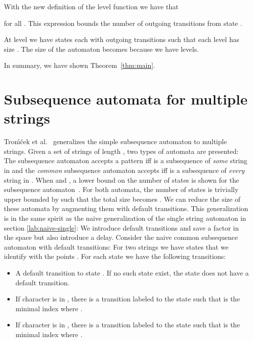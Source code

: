 \documentclass[a4paper,11pt]{article}
\begin{document}
With the new definition of the level function we have that 

for all .
This expression bounds the number of outgoing transitions from state .


At level  we have  states each with  outgoing transitions such that each level has size . The size of the automaton becomes  because we have  levels.

In summary, we have shown Theorem~\ref{thm:main}.





    
    
\section{Subsequence automata for multiple strings}







Tron\'{\i}\v{c}ek et al.~\cite{CMT2003} generalizes the simple subsequence automaton to multiple strings. Given a set of strings  of length , two types of automata are presented: The subsequence automaton accepts a pattern  iff  is a subsequence of \emph{some} string in  and the \emph{common} subsequence automaton accepts  iff  is a subsequence of \emph{every} string in . When  and , a  lower bound on the number of states is shown for the subsequence automaton~\cite{tronivcek2005size}. For both automata, the number of states is trivially upper bounded by  such that the total size becomes . We can reduce the size of these automata by augmenting them with default transitions. This generalization is in the same spirit as the naive generalization of the single string automaton in section \ref{lab:naive-single}: We introduce default transitions and save a factor  in the space but also introduce a delay. Consider the naive common subsequence automaton with default transitions: For two strings  we have  states that we identify with the points . For each state  we have the following transitions:

\begin{itemize}
\item A default transition to state . If no such state exist, the state  does not have a default transition.
\item If character  is in , there is a transition labeled  to the state  such that  is the minimal index where .
\item If character  is in , there is a transition labeled  to the state  such that  is the minimal index where .
\end{itemize}
\end{document}
